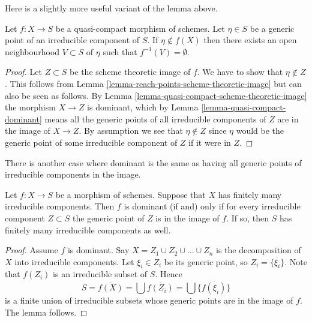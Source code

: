 \noindent
Here is a slightly more useful variant of the lemma above.

\begin{lemma}
\label{lemma-quasi-compact-generic-point-not-in-image}
Let $f : X \to S$ be a quasi-compact morphism of schemes.
Let $\eta \in S$ be a generic point of an irreducible
component of $S$. If $\eta \not \in f(X)$ then there
exists an open neighbourhood $V \subset S$ of $\eta$
such that $f^{-1}(V) = \emptyset$.
\end{lemma}

\begin{proof}
Let $Z \subset S$ be the scheme theoretic image of $f$.
We have to show that $\eta \not \in Z$.
This follows from
Lemma \ref{lemma-reach-points-scheme-theoretic-image}
but can also be seen as follows.
By Lemma \ref{lemma-quasi-compact-scheme-theoretic-image}
the morphism $X \to Z$ is dominant, which by
Lemma \ref{lemma-quasi-compact-dominant}
means all the generic points of all irreducible components of $Z$
are in the image of $X \to Z$. By assumption we see that
$\eta \not \in Z$ since $\eta$ would be the generic
point of some irreducible component of $Z$ if it were in $Z$.
\end{proof}

\noindent
There is another case where dominant is the same as having all
generic points of irreducible components in the image.

\begin{lemma}
\label{lemma-dominant-finite-number-irreducible-components}
Let $f : X \to S$ be a morphism of schemes.
Suppose that $X$ has finitely many irreducible components.
Then $f$ is dominant (if and) only if for every irreducible
component $Z \subset S$ the generic point of $Z$ is in the
image of $f$. If so, then $S$ has finitely many irreducible
components as well.
\end{lemma}

\begin{proof}
Assume $f$ is dominant.
Say $X = Z_1 \cup Z_2 \cup \ldots \cup Z_n$ is the decomposition
of $X$ into irreducible components. Let $\xi_i \in Z_i$ be
its generic point, so $Z_i = \overline{\{\xi_i\}}$.
Note that $f(Z_i)$ is an irreducible subset of $S$.
Hence
$$
S = \overline{f(X)} = \bigcup \overline{f(Z_i)} =
\bigcup \overline{\{f(\xi_i)\}}
$$
is a finite union of irreducible subsets whose generic
points are in the image of $f$. The lemma follows.
\end{proof}






